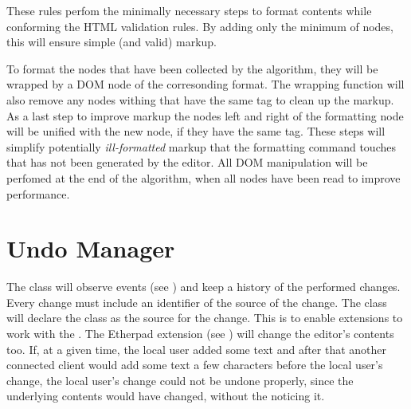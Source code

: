 These rules perfom the minimally necessary steps to format contents while conforming the HTML validation rules. By adding only the minimum of nodes, this will ensure simple (and valid) markup.

To format the nodes that have been collected by the algorithm, they will be wrapped by a DOM node of the corresonding format. The wrapping function will also remove any nodes withing that have the same tag to clean up the markup. As a last step to improve markup the nodes left and right of the formatting node will be unified with the new node, if they have the same tag. These steps will simplify potentially \textit{ill-formatted} markup that the formatting command touches that has not been generated by the editor. All DOM manipulation will be perfomed at the end of the algorithm, when all nodes have been read to improve performance.







\section{Undo Manager}
\label{sec:undo_manager}

The  class will observe  events (see ) and keep a history of the performed changes. Every change must include an identifier of the source of the change. The  class will declare the  class as the source for the change. This is to enable extensions to work with the . The Etherpad extension (see ) will change the editor's contents too. If, at a given time, the local user added some text and after that another connected client would add some text a few characters before the local user's change, the local user's change could not be undone properly, since the underlying contents would have changed, without the  noticing it.

